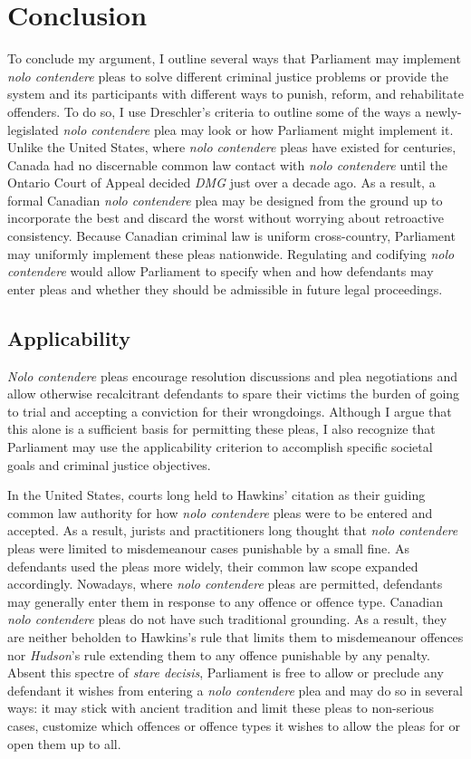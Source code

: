 \chapter{Conclusion}

To conclude my argument, I outline several ways that Parliament may implement \textit{nolo contendere} pleas to solve different criminal justice problems or provide the system and its participants with different ways to punish, reform, and rehabilitate offenders. To do so, I use Dreschler's criteria to outline some of the ways a newly-legislated \textit{nolo contendere} plea may look or how Parliament might implement it. Unlike the United States, where \textit{nolo contendere} pleas have existed for centuries, Canada had no discernable common law contact with \textit{nolo contendere} until the Ontario Court of Appeal decided \textit{DMG} just over a decade ago. As a result, a formal Canadian \textit{nolo contendere} plea may be designed from the ground up to incorporate the best and discard the worst without worrying about retroactive consistency. Because Canadian criminal law is uniform cross-country, Parliament may uniformly implement these pleas nationwide. Regulating and codifying \textit{nolo contendere} would allow Parliament to specify when and how defendants may enter pleas and whether they should be admissible in future legal proceedings.

\section{Applicability}

\textit{Nolo contendere} pleas encourage resolution discussions and plea negotiations and allow otherwise recalcitrant defendants to spare their victims the burden of going to trial and accepting a conviction for their wrongdoings. Although I argue that this alone is a sufficient basis for permitting these pleas, I also recognize that Parliament may use the applicability criterion to accomplish specific societal goals and criminal justice objectives.

In the United States, courts long held to Hawkins' citation as their guiding common law authority for how \textit{nolo contendere} pleas were to be entered and accepted. As a result, jurists and practitioners long thought that \textit{nolo contendere} pleas were limited to misdemeanour cases punishable by a small fine. As defendants used the pleas more widely, their common law scope expanded accordingly. Nowadays, where \textit{nolo contendere} pleas are permitted, defendants may generally enter them in response to any offence or offence type. Canadian \textit{nolo contendere} pleas do not have such traditional grounding. As a result, they are neither beholden to Hawkins's rule that limits them to misdemeanour offences nor \textit{Hudson}'s rule extending them to any offence punishable by any penalty. Absent this spectre of \textit{stare decisis}, Parliament is free to allow or preclude any defendant it wishes from entering a \textit{nolo contendere} plea and may do so in several ways: it may stick with ancient tradition and limit these pleas to non-serious cases, customize which offences or offence types it wishes to allow the pleas for or open them up to all.

